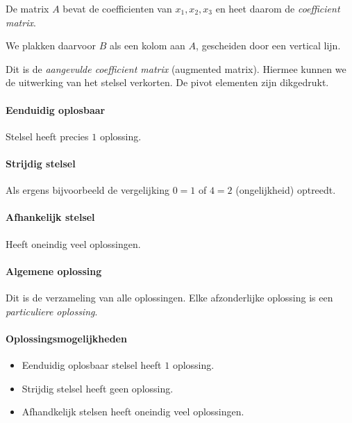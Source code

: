 \documentclass[11pt]{article}
\providecommand{\tightlist}{%
      \setlength{\itemsep}{0pt}\setlength{\parskip}{0pt}}
\begin{document}
De matrix \(A\) bevat de coefficienten van \(x_1, x_2, x_3\) en heet
daarom de \emph{coefficient matrix}.

We plakken daarvoor \(B\) als een kolom aan \(A\), gescheiden door een
vertical lijn.

Dit is de \emph{aangevulde coefficient matrix} (augmented matrix).
Hiermee kunnen we de uitwerking van het stelsel verkorten. De pivot
elementen zijn dikgedrukt.

    \hypertarget{eenduidig-oplosbaar}{%
\paragraph{Eenduidig oplosbaar}\label{eenduidig-oplosbaar}}

    Stelsel heeft precies \(1\) oplossing.

    \hypertarget{strijdig-stelsel}{%
\paragraph{Strijdig stelsel}\label{strijdig-stelsel}}

    Als ergens bijvoorbeeld de vergelijking \(0=1\) of \(4=2\)
(ongelijkheid) optreedt.

    \hypertarget{afhankelijk-stelsel}{%
\paragraph{Afhankelijk stelsel}\label{afhankelijk-stelsel}}

    Heeft oneindig veel oplossingen.

    \hypertarget{algemene-oplossing}{%
\paragraph{Algemene oplossing}\label{algemene-oplossing}}

    Dit is de verzameling van alle oplossingen. Elke afzonderlijke oplossing
is een \emph{particuliere oplossing}.

    \hypertarget{oplossingsmogelijkheden}{%
\paragraph{Oplossingsmogelijkheden}\label{oplossingsmogelijkheden}}

    \begin{itemize}
\tightlist
\item
  Eenduidig oplosbaar stelsel heeft \(1\) oplossing.
\item
  Strijdig stelsel heeft geen oplossing.
\item
  Afhandkelijk stelsen heeft oneindig veel oplossingen.
\end{itemize}
\end{document}
